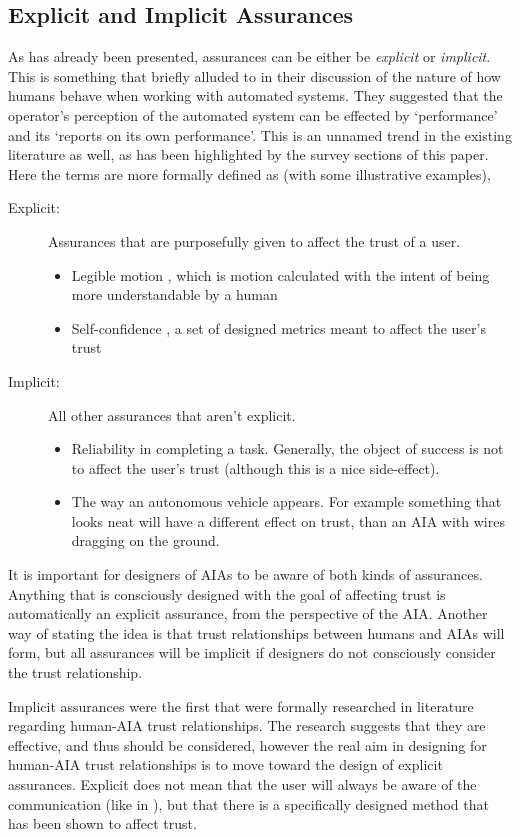 \subsection{Explicit and Implicit Assurances}
As has already been presented, assurances can be either be \emph{explicit} or \emph{implicit}. This is something that \cite{Sheridan1984-kx} briefly alluded to in their discussion of the nature of how humans behave when working with automated systems. They suggested that the operator's perception of the automated system can be effected by `performance' and its `reports on its own performance'. This is an unnamed trend in the existing literature as well, as has been highlighted by the survey sections of this paper. Here the terms are more formally defined as (with some illustrative examples),

\begin{description}
    \item [Explicit:] Assurances that are purposefully given to affect the trust of a user.
    \begin{itemize}
        \item Legible motion \cite{Dragan2013-wd}, which is motion calculated with the intent of being more understandable by a human
        \item Self-confidence \cite{Aitken2016-fb}, a set of designed metrics meant to affect the user's trust
    \end{itemize}
    \item [Implicit:] All other assurances that aren't explicit.
    \begin{itemize}
        \item Reliability in completing a task. Generally, the object of success is not to affect the user's trust (although this is a nice side-effect).
        \item The way an autonomous vehicle appears. For example something that looks neat will have a different effect on trust, than an AIA with wires dragging on the ground. 
    \end{itemize}
\end{description}

It is important for designers of AIAs to be aware of both kinds of assurances. Anything that is consciously designed with the goal of affecting trust is automatically an explicit assurance, from the perspective of the AIA. Another way of stating the idea is that trust relationships between humans and AIAs will form, but all assurances will be implicit if designers do not consciously consider the trust relationship. 

Implicit assurances were the first that were formally researched in literature regarding human-AIA trust relationships. The research suggests that they are effective, and thus should be considered, however the real aim in designing for human-AIA trust relationships is to move toward the design of explicit assurances. Explicit does not mean that the user will always be aware of the communication (like in \cite{Dragan2013-wd}), but that there is a specifically designed method that has been shown to affect trust.
